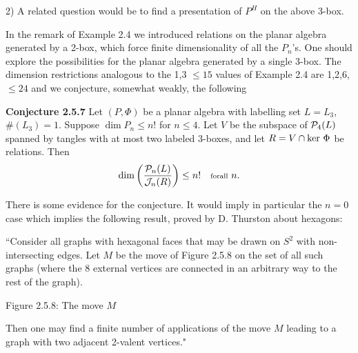 2) A related question would be to find a presentation of $P^H$ on
the above 3-box.


  In the remark of Example 2.4 we
introduced relations on the planar algebra generated by a 2-box,
which force finite dimensionality of all the $P_n$'s. One should
explore the possibilities for the planar algebra generated by a
single 3-box. The dimension restrictions analogous to the 1,3 $\leq
15$ values of Example 2.4 are 1,2,6,$\leq 24$ and we conjecture,
somewhat weakly, the following

\bs
\ni
{\bf Conjecture 2.5.7} Let $(P,\Phi)$ be a planar algebra with
labelling set $L=L_3$, $\#(L_3)=1$. Suppose $\dim P_n\leq n!$ for
$n\leq 4$. Let $V$ be the subspace of ${\cal P}_4(L)$ spanned by
tangles with at most two labeled 3-boxes, and let
$R=V\cap{\op{ker}} \ \Phi$ be relations. Then
\[
\dim\left( \frac{{\cal P}_n(L)}{{\cal J}_n(R)}\right)\leq n! \quad
{\text{for all}} \ n.
\]

\bigskip
There is some evidence for the conjecture. It would imply in
particular the $n=0$ case which implies the following
result, proved by D. Thurston about hexagons:

``Consider all graphs with hexagonal faces that may be drawn on
$S^2$ with non-intersecting edges. Let $M$ be the move of Figure
2.5.8 on the set of all such graphs (where the 8 external vertices
are connected in an arbitrary way to the rest of the graph).
\[
	
\]
\begin{center}
	Figure 2.5.8: The move $M$
\end{center}

\medskip\ni Then one may find a finite number of applications of
the move $M$ leading to a graph with two adjacent 2-valent
vertices." 


